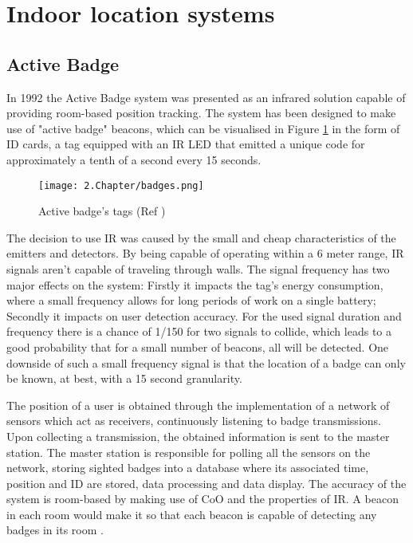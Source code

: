 \section{Indoor location systems}  
\label{sec:related}  
  
  
\subsection{Active Badge}  
\label{subsec:badge}  
  
  
In 1992 the Active Badge system \cite{badge} was presented as an infrared solution capable of providing room-based position tracking. The system has been designed to make use of "active badge" beacons, which can be visualised in Figure \ref{fig:badge} in the form of ID cards, a tag equipped with an \ac{IR} LED that emitted a unique code for approximately a tenth of a second every 15 seconds.  
  
  
\begin{figure}[H]  
\centering  
\texttt{[image: 2.Chapter/badges.png]}  
\caption[Active badge's tags (Ref \cite{badgefig}) ]{Active badge's tags (Ref \cite{badgefig}) }  
\label{fig:badge}  
\end{figure}  
  
  
The decision to use \ac{IR} was caused by the small and cheap characteristics of the emitters and detectors\cite{badge2}. By being capable of operating within a 6 meter range, \ac{IR} signals aren’t capable of traveling through walls. The signal frequency has two major effects on the system: Firstly it impacts the tag's energy consumption, where a small frequency allows for long periods of work on a single battery; Secondly it impacts on user detection accuracy. For the used signal duration and frequency there is a chance of 1/150 for two signals to collide, which leads to a good probability that for a small number of beacons, all will be detected. One downside of such a small frequency signal is that the location of a badge can only be known, at best, with a 15 second granularity.  
  
The position of a user is obtained through the implementation of a network of sensors which act as receivers, continuously listening to badge transmissions. Upon collecting a transmission, the obtained information is sent to the master station. The master station is responsible for polling all the sensors on the network, storing sighted badges into a database where its associated time, position and ID are stored, data processing and data display. The accuracy of the system is room-based by making use of \ac{CoO} and the properties of \ac{IR}. A beacon in each room would make it so that each beacon is capable of detecting any badges in its room \cite{badge1}.  
  
